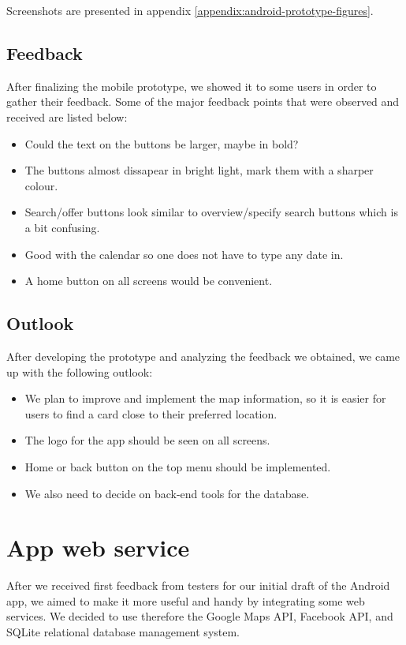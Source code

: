 \documentclass[11pt,twoside,a4paper]{report}
\begin{document}
Screenshots are presented in appendix \ref{appendix:android-prototype-figures}.

\section{Feedback}

After finalizing the mobile prototype, we showed it to some users in order to gather their feedback. Some of the major feedback points that were observed and received are listed below:

\begin{itemize}
\item Could the text on the buttons be larger, maybe in bold?
\item The buttons almost dissapear in bright light, mark them with a sharper colour.
\item Search/offer buttons look similar to overview/specify search buttons which is a bit confusing.
\item Good with the calendar so one does not have to type any date in.
\item A home button on all screens would be convenient.
\end{itemize}

\section{Outlook}

After developing the prototype and analyzing the feedback we obtained, we came up with the following outlook:

\begin{itemize}
\item We plan to improve and implement the map information, so it is easier for users to find a card close to their preferred location.
\item The logo for the app should be seen on all screens.
\item Home or back button on the top menu should be implemented.
\item We also need to decide on back-end tools for the database.
\end{itemize}

\chapter{App web service}

After we received first feedback from testers for our initial draft of the Android app, we aimed to make it more useful and handy by integrating some web services. We decided to use therefore the Google Maps API, Facebook API, and SQLite relational database management system.
\end{document}
